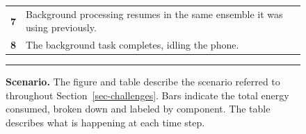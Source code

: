 \begin{figure}[t]
\begin{minipage}[t]{0.5\textwidth}
\begin{tabularx}{\columnwidth}{cX}
\textbf{7} & Background processing resumes in the same ensemble it was using
previously.
\\

\textbf{8} &
The background task completes, idling the phone.
\\

\end{tabularx}
\end{minipage}
\vspace{-0.1in}
\caption{\normalsize \textbf{Scenario.} The figure and table describe the
scenario referred to throughout Section~\ref{sec-challenges}. Bars indicate
the total energy consumed, broken down and labeled by component. The table
describes what is happening at each time step.}

\label{figure-transitiongraph}
\vspace{0.10in}
\hrule
\vspace{-0.20in}
\end{figure}
